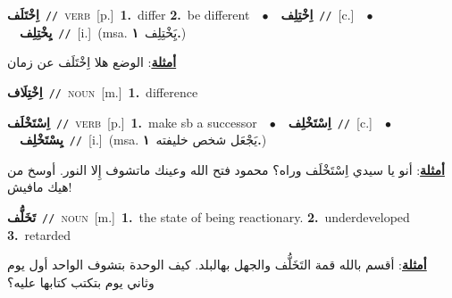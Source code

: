 \documentclass[10pt,a4paper,twoside]{article} %
\begin{document}
\begin{multicols}{2}
{\setlength\topsep{0pt}\textbf{\foreignlanguage{arabic}{اِخْتَلَف}}\ {\color{gray}\texttt{//}\color{black}}\ \textsc{verb}\ [p.]\ \textbf{1.}~differ  \textbf{2.}~be different\ \ $\bullet$\ \ \setlength\topsep{0pt}\textbf{\foreignlanguage{arabic}{اِخْتِلِف}}\ {\color{gray}\texttt{//}\color{black}}\ [c.]\ \ $\bullet$\ \ \setlength\topsep{0pt}\textbf{\foreignlanguage{arabic}{يِخْتِلِف}}\ {\color{gray}\texttt{//}\color{black}}\ [i.]\ \color{gray}(msa. \foreignlanguage{arabic}{يَِخْتِلِف}~\foreignlanguage{arabic}{\textbf{١.}})\color{black}\  \begin{flushright}\color{gray}\foreignlanguage{arabic}{\textbf{\underline{\foreignlanguage{arabic}{أمثلة}}}: الوضع هلا اِخْتَلَف عن زمان}\end{flushright}\color{black}} \vspace{2mm}

{\setlength\topsep{0pt}\textbf{\foreignlanguage{arabic}{اِخْتِلَاف}}\ {\color{gray}\texttt{//}\color{black}}\ \textsc{noun}\ [m.]\ \textbf{1.}~difference\ } \vspace{2mm}

{\setlength\topsep{0pt}\textbf{\foreignlanguage{arabic}{اِسْتَخْلَف}}\ {\color{gray}\texttt{//}\color{black}}\ \textsc{verb}\ [p.]\ \textbf{1.}~make sb a successor\ \ $\bullet$\ \ \setlength\topsep{0pt}\textbf{\foreignlanguage{arabic}{اِسْتَخْلِف}}\ {\color{gray}\texttt{//}\color{black}}\ [c.]\ \ $\bullet$\ \ \setlength\topsep{0pt}\textbf{\foreignlanguage{arabic}{يِسْتَخْلِف}}\ {\color{gray}\texttt{//}\color{black}}\ [i.]\ \color{gray}(msa. \foreignlanguage{arabic}{يَجْعَل شخص خليفته}~\foreignlanguage{arabic}{\textbf{١.}})\color{black}\  \begin{flushright}\color{gray}\foreignlanguage{arabic}{\textbf{\underline{\foreignlanguage{arabic}{أمثلة}}}: أنو يا سيدي اِسْتَخْلَف وراه؟ محمود فتح الله وعينك ماتشوف إِلا النور. أوسخ من هيك مافيش!}\end{flushright}\color{black}} \vspace{2mm}

{\setlength\topsep{0pt}\textbf{\foreignlanguage{arabic}{تَخَلُّف}}\ {\color{gray}\texttt{//}\color{black}}\ \textsc{noun}\ [m.]\ \textbf{1.}~the state of being reactionary.  \textbf{2.}~underdeveloped  \textbf{3.}~retarded\  \begin{flushright}\color{gray}\foreignlanguage{arabic}{\textbf{\underline{\foreignlanguage{arabic}{أمثلة}}}: أقسم بالله قمة التَخَلُّف والجهل بهالبلد. كيف الوحدة بتشوف الواحد أول يوم وثاني يوم بتكتب كتابها عليه؟}\end{flushright}\color{black}} \vspace{2mm}


\end{multicols}
\end{document}
